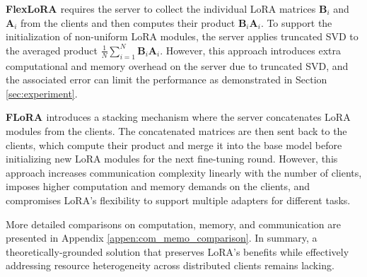 \documentclass{article} %
\theoremstyle{plain}
\theoremstyle{definition}
\begin{document}
\textbf{FlexLoRA \citep{bai2024federatedfinetuninglargelanguage}} requires the server to collect the individual LoRA matrices $\mathbf{B}_i $ and $ \mathbf{A}_i$ from the clients and then computes their product $\mathbf{B}_i \mathbf{A}_i$. To support the initialization of non-uniform LoRA modules, the server applies truncated SVD to the averaged product $\frac{1}{N} \sum_{i=1}^N \mathbf{B}_i \mathbf{A}_i$. However, this approach introduces extra computational and memory overhead on the server due to truncated SVD, and the associated error can limit the performance as demonstrated in Section \ref{sec:experiment}.
   

\textbf{FLoRA \citep{wang2024flora}} introduces a stacking mechanism where the server concatenates LoRA modules from the clients. The concatenated matrices are then sent back to the clients, which compute their product and merge it into the base model before initializing new LoRA modules for the next fine-tuning round. However, this approach increases communication complexity linearly with the number of clients, imposes higher computation and memory demands on the clients, and compromises LoRA's flexibility to support multiple adapters for different tasks.

More detailed comparisons on computation, memory, and communication are presented in Appendix \ref{appen:com_memo_comparison}.
In summary, a theoretically-grounded solution that preserves LoRA's benefits while effectively addressing resource heterogeneity across distributed clients remains lacking. 
\vspace{-1.5mm}
\end{document}
